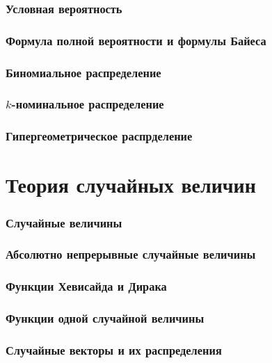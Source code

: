 \section{Условная вероятность}

\section{Формула полной вероятности и формулы Байеса}

\section{Биномиальное распределение}

\section{$k$-номинальное распределение}

\section{Гипергеометрическое распрделение}

\part{Теория случайных величин}

\section{Случайные величины}

\section{Абсолютно непрерывные случайные величины}

\section{Функции Хевисайда и Дирака}

\section{Функции одной случайной величины}

\section{Случайные векторы и их распределения}

